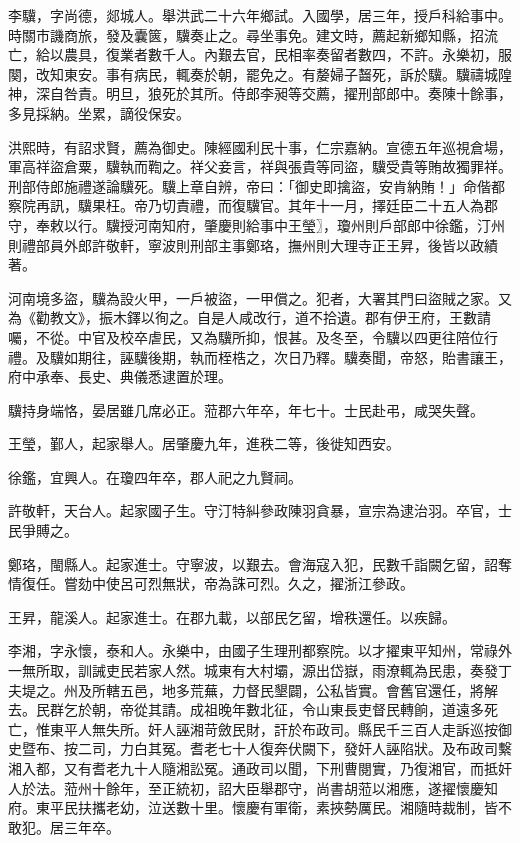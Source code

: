 \begin{pinyinscope}
李驥，字尚德，郯城人。舉洪武二十六年鄉試。入國學，居三年，授戶科給事中。時關市譏商旅，發及囊篋，驥奏止之。尋坐事免。建文時，薦起新鄉知縣，招流亡，給以農具，復業者數千人。內艱去官，民相率奏留者數四，不許。永樂初，服闋，改知東安。事有病民，輒奏於朝，罷免之。有嫠婦子齧死，訴於驥。驥禱城隍神，深自咎責。明旦，狼死於其所。侍郎李昶等交薦，擢刑部郎中。奏陳十餘事，多見採納。坐累，謫役保安。

洪熙時，有詔求賢，薦為御史。陳經國利民十事，仁宗嘉納。宣德五年巡視倉場，軍高祥盜倉粟，驥執而鞫之。祥父妾言，祥與張貴等同盜，驥受貴等賄故獨罪祥。刑部侍郎施禮遂論驥死。驥上章自辨，帝曰：「御史即擒盜，安肯納賄！」命偕都察院再訊，驥果枉。帝乃切責禮，而復驥官。其年十一月，擇廷臣二十五人為郡守，奉敕以行。驥授河南知府，肇慶則給事中王瑩〗，瓊州則戶部郎中徐鑑，汀州則禮部員外郎許敬軒，寧波則刑部主事鄭珞，撫州則大理寺正王昇，後皆以政績著。

河南境多盜，驥為設火甲，一戶被盜，一甲償之。犯者，大署其門曰盜賊之家。又為《勸教文》，振木鐸以徇之。自是人咸改行，道不拾遺。郡有伊王府，王數請囑，不從。中官及校卒虐民，又為驥所抑，恨甚。及冬至，令驥以四更往陪位行禮。及驥如期往，誣驥後期，執而桎梏之，次日乃釋。驥奏聞，帝怒，貽書讓王，府中承奉、長史、典儀悉逮置於理。

驥持身端恪，晏居雖几席必正。蒞郡六年卒，年七十。士民赴弔，咸哭失聲。

王瑩，鄞人，起家舉人。居肇慶九年，進秩二等，後徙知西安。

徐鑑，宜興人。在瓊四年卒，郡人祀之九賢祠。

許敬軒，天台人。起家國子生。守汀特糾參政陳羽貪暴，宣宗為逮治羽。卒官，士民爭賻之。

鄭珞，閩縣人。起家進士。守寧波，以艱去。會海寇入犯，民數千詣闕乞留，詔奪情復任。嘗劾中使呂可烈無狀，帝為誅可烈。久之，擢浙江參政。

王昇，龍溪人。起家進士。在郡九載，以部民乞留，增秩還任。以疾歸。

李湘，字永懷，泰和人。永樂中，由國子生理刑都察院。以才擢東平知州，常祿外一無所取，訓誡吏民若家人然。城東有大村壩，源出岱嶽，雨潦輒為民患，奏發丁夫堤之。州及所轄五邑，地多荒蕪，力督民墾闢，公私皆實。會舊官還任，將解去。民群乞於朝，帝從其請。成祖晚年數北征，令山東長吏督民轉餉，道遠多死亡，惟東平人無失所。奸人誣湘苛斂民財，訐於布政司。縣民千三百人走訴巡按御史暨布、按二司，力白其冤。耆老七十人復奔伏闕下，發奸人誣陷狀。及布政司繫湘入都，又有耆老九十人隨湘訟冤。通政司以聞，下刑曹閱實，乃復湘官，而抵奸人於法。蒞州十餘年，至正統初，詔大臣舉郡守，尚書胡蒞以湘應，遂擢懷慶知府。東平民扶攜老幼，泣送數十里。懷慶有軍衛，素挾勢厲民。湘隨時裁制，皆不敢犯。居三年卒。


\end{pinyinscope}
